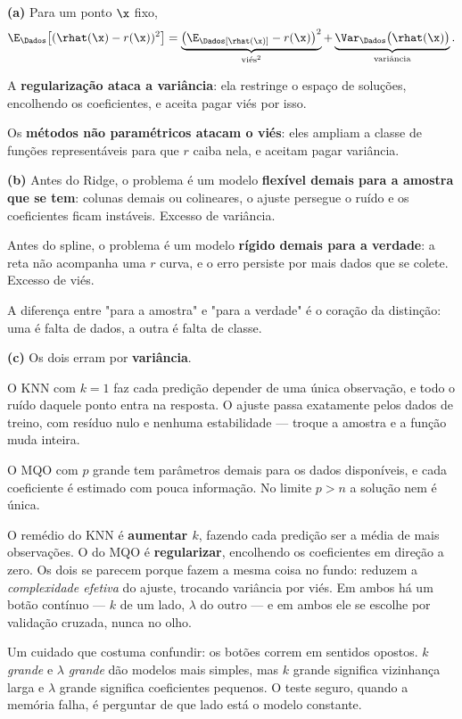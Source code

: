 \begin{solucao}
\textbf{(a)} Para um ponto $\x$ fixo,
\[
  \E_\Dados\big[(\rhat(\x)-r(\x))^2\big]
   = \underbrace{\big(\E_\Dados[\rhat(\x)]-r(\x)\big)^2}_{\text{viés}^2}
   + \underbrace{\Var_\Dados\big(\rhat(\x)\big)}_{\text{variância}} .
\]

A \textbf{regularização ataca a variância}: ela restringe o espaço de soluções,
encolhendo os coeficientes, e aceita pagar viés por isso.

Os \textbf{métodos não paramétricos atacam o viés}: eles ampliam a classe de
funções representáveis para que $r$ caiba nela, e aceitam pagar variância.

\smallskip
\textbf{(b)} Antes do Ridge, o problema é um modelo \textbf{flexível demais para a
amostra que se tem}: colunas demais ou colineares, o ajuste persegue o ruído e os
coeficientes ficam instáveis. Excesso de variância.

Antes do spline, o problema é um modelo \textbf{rígido demais para a verdade}: a
reta não acompanha uma $r$ curva, e o erro persiste por mais dados que se colete.
Excesso de viés.

A diferença entre "para a amostra" e "para a verdade" é o coração da distinção:
uma é falta de dados, a outra é falta de classe.

\smallskip
\textbf{(c)} Os dois erram por \textbf{variância}.

O KNN com $k=1$ faz cada predição depender de uma única observação, e todo o ruído
daquele ponto entra na resposta. O ajuste passa exatamente pelos dados de treino,
com resíduo nulo e nenhuma estabilidade --- troque a amostra e a função muda
inteira.

O MQO com $p$ grande tem parâmetros demais para os dados disponíveis, e cada
coeficiente é estimado com pouca informação. No limite $p>n$ a solução nem é
única.

O remédio do KNN é \textbf{aumentar $k$}, fazendo cada predição ser a média de
mais observações. O do MQO é \textbf{regularizar}, encolhendo os coeficientes em
direção a zero. Os dois se parecem porque fazem a mesma coisa no fundo: reduzem a
\emph{complexidade efetiva} do ajuste, trocando variância por viés. Em ambos há um
botão contínuo --- $k$ de um lado, $\lambda$ do outro --- e em ambos ele se
escolhe por validação cruzada, nunca no olho.

Um cuidado que costuma confundir: os botões correm em sentidos opostos. $k$
\emph{grande} e $\lambda$ \emph{grande} dão modelos mais simples, mas $k$ grande
significa vizinhança larga e $\lambda$ grande significa coeficientes pequenos. O
teste seguro, quando a memória falha, é perguntar de que lado está o modelo
constante.


\end{solucao}
